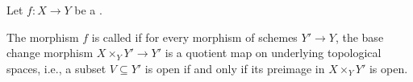 \begin{definition} \label{definition:universally_submersive_morphism_of_schemes}
    Let $f: X \to Y$ be a .

    The morphism $f$ is called  if for every morphism of schemes $Y' \to Y$, the base change morphism $X \times_Y Y' \to Y'$ is a quotient map on underlying topological spaces, i.e., a subset $V \subseteq Y'$ is open if and only if its preimage in $X \times_Y Y'$ is open.
\end{definition}
